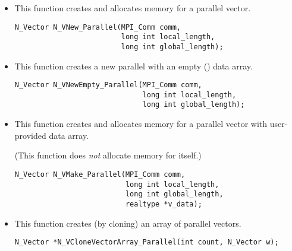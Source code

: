 \begin{itemize}


\item  {}
  
  This function creates and allocates memory for a parallel vector.
 
  

\begin{verbatim}
N_Vector N_VNew_Parallel(MPI_Comm comm, 
                         long int local_length, 
                         long int global_length);
\end{verbatim}
  

\item {}
 
  This function creates a new parallel  with an empty () data array.
 
  

\begin{verbatim}
N_Vector N_VNewEmpty_Parallel(MPI_Comm comm, 
                              long int local_length, 
                              long int global_length);
\end{verbatim}

  

\item {}
  
  This function creates and allocates memory for a parallel vector
  with user-provided data array.
 
  (This function does {\em not} allocate memory for  itself.)

\begin{verbatim}
N_Vector N_VMake_Parallel(MPI_Comm comm, 
                          long int local_length,
                          long int global_length,
                          realtype *v_data);
\end{verbatim}


\item {}
 
  This function creates (by cloning) an array of  parallel vectors.
 
\begin{verbatim}
N_Vector *N_VCloneVectorArray_Parallel(int count, N_Vector w);
\end{verbatim}


\end{itemize}

